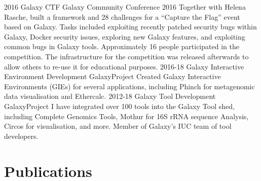 \documentclass[]{shiltemann-cv}
\begin{document}
\begin{entrylist}
  \entry
    {2016}
    {Galaxy CTF}
    {Galaxy Community Conference 2016}
    {Together with Helena Rasche, built a framework and 28 challenges for a “Capture the Flag” event based on Galaxy. Tasks included exploiting recently patched security bugs within Galaxy, Docker security issues, exploring new Galaxy features, and exploiting common bugs in Galaxy tools. Approximately 16 people participated in the competition. The infrastructure for the competition was released afterwards to allow others to re-use it for educational purposes.}
   \entry
     {2016-18}
     {Galaxy Interactive Environment Development}
     {GalaxyProject}
     {Created Galaxy Interactive Environments (GIEs) for several applications, including Phinch for metagenomic data visualisation and Ethercalc.}
   \entry
    {2012-18}
    {Galaxy Tool Development}
    {GalaxyProject}
    {I have integrated over 100 tools into the Galaxy Tool shed, including Complete Genomics Tools, Mothur for 16S rRNA sequence Analysis, Circos for visualisation, and more. Member of Galaxy's IUC team of tool developers.}
\end{entrylist}

\section{Publications}
\end{document}

